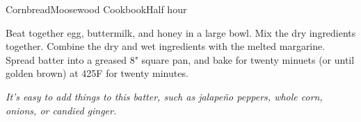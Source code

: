 \begin{recipe}{Cornbread}{Moosewood Cookbook}{Half hour}

  Beat together egg, buttermilk, and honey in a large bowl. Mix the
  dry ingredients together. Combine the dry and wet ingredients with
  the melted margarine. Spread batter into a greased 8" square pan,
  and bake for twenty minuets (or until golden brown) at 425\0F for
  twenty minutes.
\end{recipe}
\textit{ It's easy to add things to this batter, such as jalape\~no
  peppers, whole corn, onions, or candied ginger.}
